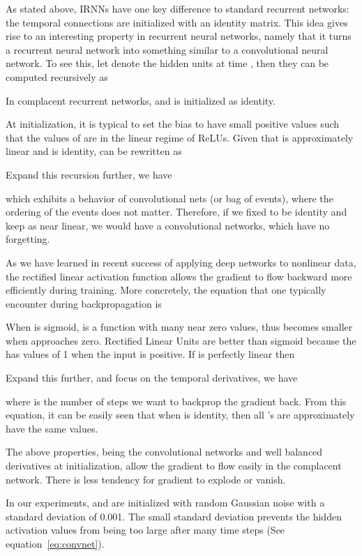 \documentclass{article} \usepackage{nips14submit_e,times,graphicx}
\begin{document}
As stated above, IRNNs have one key difference to standard recurrent
networks: the temporal connections are initialized with an identity
matrix. This idea gives rise to an interesting property in recurrent
neural networks, namely that it turns a recurrent neural network into
something similar to a convolutional neural network. To see this, let
 denote the hidden units at time , then they can be
computed recursively as

In complacent recurrent networks,  and  is
initialized as identity.

At initialization, it is typical to set the bias  to have small
positive values such that the values of  are in
the linear regime of ReLUs. Given that  is approximately linear
and  is identity,  can be rewritten as

Expand this recursion further, we have

which exhibits a behavior of convolutional nets (or bag of events),
where the ordering of the events does not matter. Therefore, if we
fixed  to be identity and keep  as near linear, we would
have a convolutional networks, which have no forgetting.

As we have learned in recent success of applying deep networks to
nonlinear data, the rectified linear activation function allows the
gradient to flow backward more efficiently during training. More
concretely, the equation that one typically encounter during
backpropagation is


When  is sigmoid,  is a function with many near zero values,
thus  becomes smaller when  approaches
zero. Rectified Linear Units are better than sigmoid because the 
has values of 1 when the input is positive. If  is perfectly linear
then

Expand this further, and focus on the temporal derivatives, we have

where  is the number of steps we want to backprop the gradient
back. From this equation, it can be easily seen that when  is
identity, then all 's are approximately have the same values.




The above properties, being the convolutional networks and well
balanced derivatives at initialization, allow the gradient to flow
easily in the complacent network. There is less tendency for gradient
to explode or vanish.

In our experiments,  and  are initialized with random Gaussian
noise with a standard deviation of 0.001. The small standard deviation
prevents the hidden activation values from being too large after many
time steps (See equation~\ref{eq:convnet}).
\fi
\end{document}
